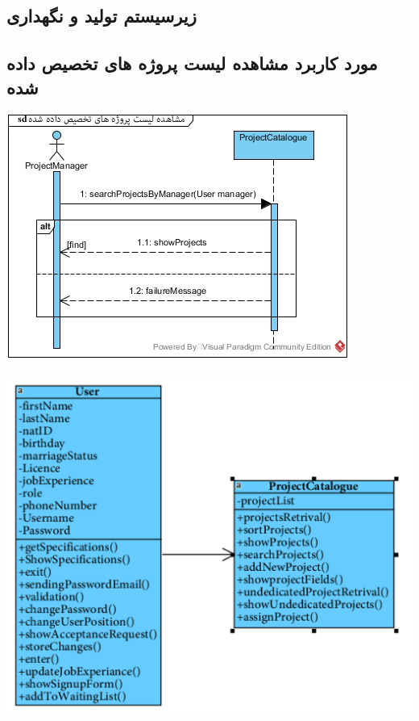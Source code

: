 \newpage
\subsection{زیرسیستم تولید و نگهداری}

\vspace{2cm}
\subsection*{مورد کاربرد مشاهده لیست پروژه های تخصیص داده شده}
\vspace{2cm}
\begin{center}
\includegraphics[width=\textwidth]{SequenceDiagrams/16.jpg}
\end{center}

\newpage
\vspace{2cm}
\begin{center}
\includegraphics[width=\textwidth]{SequenceClasses/16.png}
\end{center}


